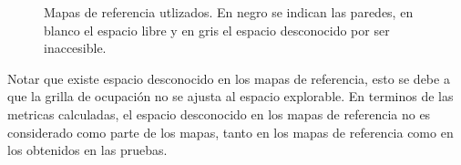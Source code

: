 \begin{figure}[H]
  \centerfloat

  \qquad
  \qquad
  \qquad

  \caption[Mapas de referencia utlizados.]{Mapas de referencia utlizados. En negro se indican las paredes, en blanco el espacio libre y en gris el espacio desconocido por ser inaccesible.}\label{fig:mref}

\end{figure}

Notar que existe espacio desconocido en los mapas de referencia, esto se debe a
que la grilla de ocupación no se ajusta al espacio explorable. En terminos de
las metricas calculadas, el espacio desconocido en los mapas de referencia no es
considerado como parte de los mapas, tanto en los mapas de referencia como en
los obtenidos en las pruebas.

